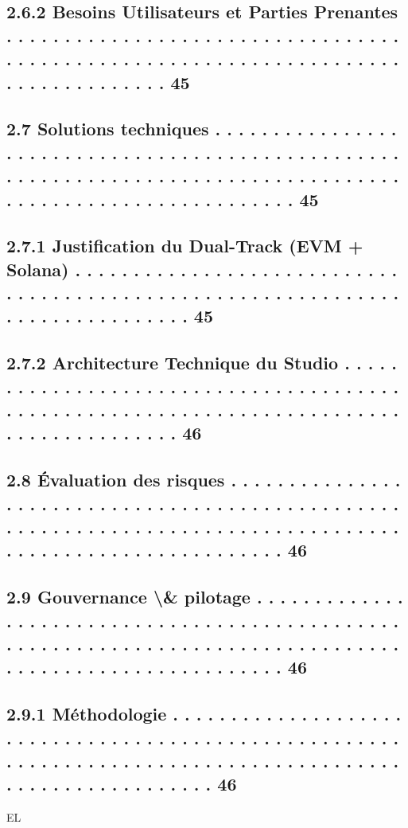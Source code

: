 \subsection{2.6.2               Besoins Utilisateurs et Parties Prenantes . . . . . . . . . . . . . . . . . . . . . . . . . . . . . . . . . . . . . . . . . . . . . . . . . . . . . . . . . . . . . . . . . . . . . . . . . . . . . . . . . . 45}
\subsection{2.7     Solutions techniques . . . . . . . . . . . . . . . . . . . . . . . . . . . . . . . . . . . . . . . . . . . . . . . . . . . . . . . . . . . . . . . . . . . . . . . . . . . . . . . . . . . . . . . . . . . . . . . . . . . . . . . . . . . . . 45}
\subsection{2.7.1               Justification du Dual-Track (EVM + Solana) . . . . . . . . . . . . . . . . . . . . . . . . . . . . . . . . . . . . . . . . . . . . . . . . . . . . . . . . . . . . . . . . . . . . . . . . . . . . . . 45}
\subsection{2.7.2               Architecture Technique du Studio . . . . . . . . . . . . . . . . . . . . . . . . . . . . . . . . . . . . . . . . . . . . . . . . . . . . . . . . . . . . . . . . . . . . . . . . . . . . . . . . . . . . . . . . 46}
\subsection{2.8     Évaluation des risques . . . . . . . . . . . . . . . . . . . . . . . . . . . . . . . . . . . . . . . . . . . . . . . . . . . . . . . . . . . . . . . . . . . . . . . . . . . . . . . . . . . . . . . . . . . . . . . . . . . . . . . . . . . 46}
\subsection{2.9     Gouvernance \textbackslash{}& pilotage . . . . . . . . . . . . . . . . . . . . . . . . . . . . . . . . . . . . . . . . . . . . . . . . . . . . . . . . . . . . . . . . . . . . . . . . . . . . . . . . . . . . . . . . . . . . . . . . . . . . . . . . . 46}
\subsection{2.9.1               Méthodologie . . . . . . . . . . . . . . . . . . . . . . . . . . . . . . . . . . . . . . . . . . . . . . . . . . . . . . . . . . . . . . . . . . . . . . . . . . . . . . . . . . . . . . . . . . . . . . . . . . . . . . . . . . 46}
\vspace{0.5em}
\vspace{0.5em}
\vspace{0.5em}
\vspace{0.5em}
EL\\
